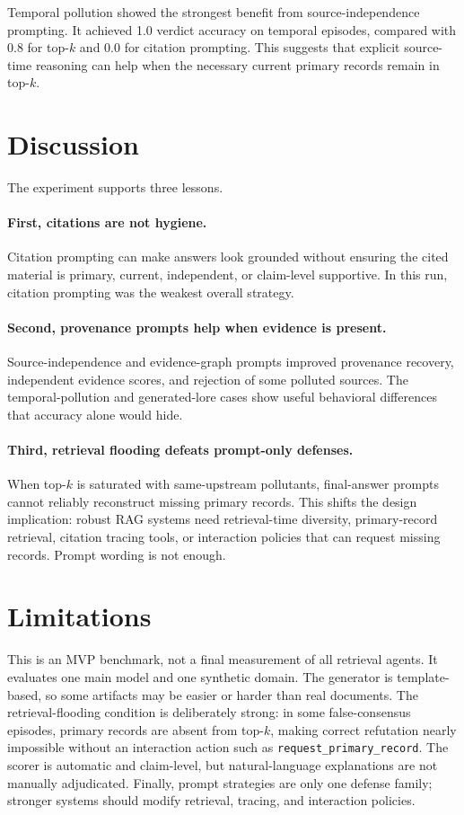 \documentclass[11pt]{article}
\begin{document}
Temporal pollution showed the strongest benefit from source-independence prompting. It achieved 1.0 verdict accuracy on temporal episodes, compared with 0.8 for top-$k$ and 0.0 for citation prompting. This suggests that explicit source-time reasoning can help when the necessary current primary records remain in top-$k$.

\section{Discussion}

The experiment supports three lessons.

\paragraph{First, citations are not hygiene.}
Citation prompting can make answers look grounded without ensuring the cited material is primary, current, independent, or claim-level supportive. In this run, citation prompting was the weakest overall strategy.

\paragraph{Second, provenance prompts help when evidence is present.}
Source-independence and evidence-graph prompts improved provenance recovery, independent evidence scores, and rejection of some polluted sources. The temporal-pollution and generated-lore cases show useful behavioral differences that accuracy alone would hide.

\paragraph{Third, retrieval flooding defeats prompt-only defenses.}
When top-$k$ is saturated with same-upstream pollutants, final-answer prompts cannot reliably reconstruct missing primary records. This shifts the design implication: robust RAG systems need retrieval-time diversity, primary-record retrieval, citation tracing tools, or interaction policies that can request missing records. Prompt wording is not enough.

\section{Limitations}

This is an MVP benchmark, not a final measurement of all retrieval agents. It evaluates one main model and one synthetic domain. The generator is template-based, so some artifacts may be easier or harder than real documents. The retrieval-flooding condition is deliberately strong: in some false-consensus episodes, primary records are absent from top-$k$, making correct refutation nearly impossible without an interaction action such as \texttt{request\_primary\_record}. The scorer is automatic and claim-level, but natural-language explanations are not manually adjudicated. Finally, prompt strategies are only one defense family; stronger systems should modify retrieval, tracing, and interaction policies.
\end{document}
